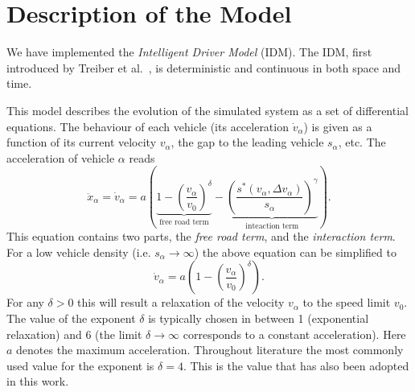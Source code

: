 \section{Description of the Model}
\label{sec:model}
We have implemented the \emph{Intelligent Driver Model} (IDM). The IDM, first introduced by Treiber et al.\ \cite{treiber1999, treiber2000}, is deterministic and continuous in both space and time.

This model describes the evolution of the simulated system as a set of differential equations. The behaviour of each vehicle (its acceleration $\dot{v}_\alpha$) is given as a function of its current velocity $v_\alpha$, the gap to the leading vehicle $s_\alpha$, etc.
The acceleration of vehicle $\alpha$ reads 
\begin{equation}
\ddot x_\alpha = \dot v_\alpha = a\left(\underbrace{1-\left(\frac{v_\alpha}{v_0}\right)^\delta}_{\text{free road term}} - \underbrace{\left(\frac{s^*(v_\alpha, \Delta v_\alpha)}{s_\alpha}\right)^\gamma}_{\text{inteaction term}}\right).
\label{eq:IDM}
\end{equation}
This equation contains two parts, the \emph{free road term}, and the \emph{interaction term}. For a low vehicle density (i.e. $s_\alpha \rightarrow \infty$) the above equation can be simplified to
\begin{equation}
\dot v_\alpha = a\left(1-\left(\frac{v_\alpha}{v_0}\right)^\delta\right).
\end{equation}
For any $\delta>0$ this will result a relaxation of the velocity $v_\alpha$ to the speed limit $v_0$. The value of the exponent $\delta$ is typically chosen in between 1 (exponential relaxation) and 6 (the limit $\delta\rightarrow \infty$ corresponds to a constant acceleration). Here $a$ denotes the maximum acceleration. Throughout literature the most commonly used value for the exponent is $\delta=4$. This is the value that has also been adopted in this work.

